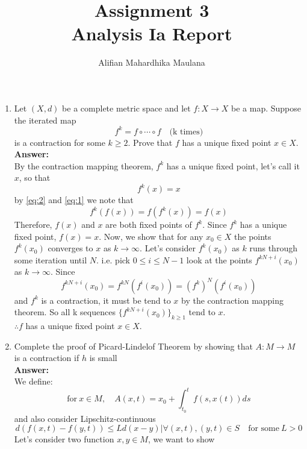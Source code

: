 \documentclass[a4paper,12pt]{article}
\title{Assignment 3 \\ Analysis Ia Report}
\author{Alifian Mahardhika Maulana}
\begin{document}
\maketitle
\begin{enumerate}
	\item Let $(X,d)$ be a complete metric space and let $f:X \to X$ be a map. Suppose the iterated map
	\begin{equation}\label{eq:1}
	f^k = f \circ \cdots \circ f \quad \text{(k times)}
	\end{equation}
	is a contraction for some $k\geq 2$. Prove that $f$ has a unique fixed point $x \in X$.\\
	\newline
	\textbf{Answer:}\\
	By the contraction mapping theorem, $f^k$ has a unique fixed point, let's call it $x$, so that
	\begin{equation}\label{eq:2}
	f^k(x) = x
	\end{equation}
	by \eqref{eq:2} and \eqref{eq:1} we note that $$f^k(f(x)) = f(f^k(x)) = f(x)$$
	Therefore, $f(x)$ and $x$ are both fixed points of $f^k$. Since $f^k$ has a unique fixed point, $f(x) = x$. Now, we show that for any $x_0 \in X$ the points $f^k(x_0)$ converges to $x$ as $k\to \infty$. Let's consider $f^k(x_0)$ as $k$ runs through some iteration until $N$. i.e. pick $0 \leq i \leq N-1$ look at the points $f^{kN+i}(x_0)$ as $k\to\infty$. Since
	$$f^{kN+i}(x_0) = f^{kN}(f^i(x_0)) = (f^k)^N(f^i(x_0))$$
	and $f^k$ is a contraction, it must be tend to $x$ by the contraction mapping theorem. So all k sequences $\{f^{kN+i}(x_0)\}_{k\geq 1}$ tend to $x$.\\
	$\therefore f$ has a unique fixed point $x \in X$.
	\newpage
	\item Complete the proof of Picard-Lindelof Theorem by showing that $A:M \to M$ is a contraction if $h$ is small\\
	\newline
	\textbf{Answer:}\\
	We define:
	\begin{equation}\label{eq:fa}
	\text{for}\ x\in M,\quad A(x,t) = x_0 + \int_{t_0}^{t} f(s,x(t)) ds
	\end{equation}
	and also consider Lipschitz-continuous
	\begin{equation}\label{eq:lipschitz}
	d(f(x,t) - f(y,t)) \leq Ld(x-y)\bigr|\forall(x,t),(y,t)\in S \quad \text{for some}\ L > 0
	\end{equation}
	Let's consider two function $x,y \in M$, we want to show

\end{enumerate}
\end{document}
